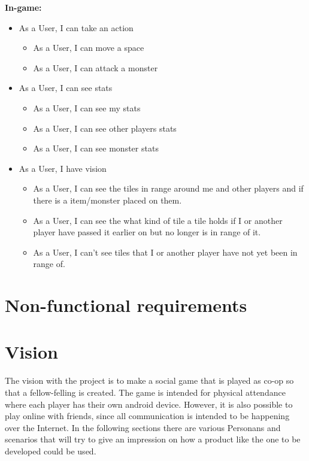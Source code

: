 	\textbf{In-game:}
	\begin{itemize}	
		
		\item As a User, I can take an action
		\begin{itemize}
			\item As a User, I can move a space
			\item As a User, I can attack a monster
		\end{itemize}
		
		\item As a User, I can see stats
		\begin{itemize}
			\item As a User, I can see my stats
			\item As a User, I can see other players stats
			\item As a User, I can see monster stats
		\end{itemize}
		\item As a User, I have vision
		\begin{itemize}
			\item As a User, I can see the tiles in range around me and other players and if there is a item/monster placed on them.
			\item As a User, I can see the what kind of tile a tile holds if I or another player have passed it earlier on but no longer is in range of it.
			\item As a User, I can't see tiles that I or another player have not yet been in range of.
		\end{itemize}
	\end{itemize}

\section{Non-functional requirements}


\section{Vision}
	The vision with the project is to make a social game that is played as co-op so that a fellow-felling is created.  The game is intended for physical attendance where each player has their own android device. However, it is also possible to play online with friends, since all communication is intended to be happening over the Internet. In the following sections there are various Personans and scenarios that will try to give an impression on how a product like the one to be developed could be used.


